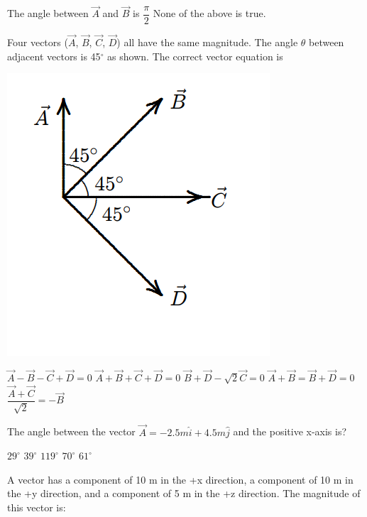 \documentclass[12pt,addpoints]{exam}
\begin{document}
{{{\begin{questions}
\begin{choices}
						\choice The angle between $\vec{A}$ and $\vec{B}$ is $\dfrac{\pi}{2}$
						\choice None of the above is true.
					\end{choices}
					\question Four vectors ($\vec{A}$, $\vec{B}$, $\vec{C}$, $\vec{D}$) all have the same magnitude. The angle $\theta$ between adjacent vectors
					is 45$^\circ$ as shown. The correct vector equation is
					\begin{center}
						\includegraphics[scale=0.4]{vecs2.png}
					\end{center} 
					\begin{oneparchoices}
						\choice $\vec{A}-\vec{B}-\vec{C}+\vec{D}=0$
						\choice $\vec{A}+\vec{B}+\vec{C}+\vec{D}=0$ 
						\choice $\vec{B}+\vec{D}-\sqrt{2}\vec C=0$
						\choice $\vec{A}+\vec{B}=\vec{B}+\vec{D}=0$
						\choice $\dfrac{\vec{A}+\vec{C}}{\sqrt{2}}=-\vec{B}$	
					\end{oneparchoices}
					\question The angle between the vector $\vec{A}=-2.5m\hat i+4.5m\hat j$ and the positive x-axis is? \\ 
					\begin{oneparchoices}
						\choice $29^\circ$
						\choice $39^\circ$
						\choice $119^\circ$
						\choice $70^\circ$
						\choice $61^\circ$
					\end{oneparchoices}
					\question A vector has a component of 10 m in the +x direction, a component of 10 m in the +y direction,
					and a component of 5 m in the +z direction. The magnitude of this vector is: \\
					\begin{oneparchoices}

\end{oneparchoices}
\end{questions}}}}
\end{document}
